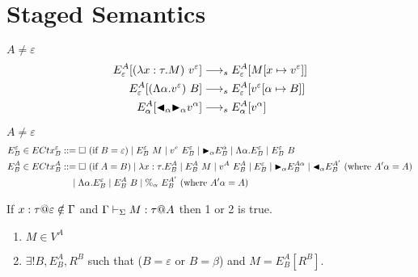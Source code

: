\section{ Staged Semantics }
	
	
$A \neq \varepsilon$\\
\begin{align*}
	E^A_\varepsilon [(\lambda x:\tau.M)\ v^\varepsilon] & \longrightarrow_s E^A_\varepsilon[M[x\mapsto v^\varepsilon]]      \\
	E^A_\varepsilon [(\Lambda\alpha.v^\varepsilon)\ B]  & \longrightarrow_s E^A_\varepsilon[v^\varepsilon[\alpha\mapsto B]] \\
	E^A_\alpha [{\mathop{\blacktriangleleft}}_\alpha {\mathop{\blacktriangleright}}_\alpha v^\alpha]        & \longrightarrow_s E^A_\alpha[v^\alpha]                            \\
\end{align*}
	
$A \neq \varepsilon$\\
\begin{align*}
	E^\varepsilon_B \in ECtx^\varepsilon_B & ::= \square\ (\text{if\ } B = \varepsilon) \mid E^\varepsilon_B\ M \mid v^e\ E^\varepsilon_B 
	\mid {\mathop{\blacktriangleright}}_\alpha E^\alpha_B \mid \Lambda\alpha.E^\varepsilon_B
	\mid E^\varepsilon_B\ B                                                                                                     \\
	E^A_B \in ECtx^A_B                     & ::= \square\ (\text{if } A = B) \mid \lambda x:\tau.E^A_B \mid E^A_B\ M \mid v^A\ E^A_B      
	\mid E^\varepsilon_B \mid {\mathop{\blacktriangleright}}_\alpha E^{A\alpha}_B
	\mid {\mathop{\blacktriangleleft}}_\alpha E^{A'}_B \ (\text{where } A'\alpha = A)                                                                              \\
	                                       & \quad \mid \Lambda\alpha.E^\varepsilon_B                                                     
	\mid E^A_B\ B \mid \%_\alpha\ E^{A'}_B \ (\text{where } A'\alpha = A)                                                       \\
\end{align*}
	
\begin{lemma}
	If $x:\tau@\varepsilon \notin \G$ and $\Gamma \vdash_\Sigma M : \tau @ A$ then 1 or 2 is true.
	\begin{enumerate}
		\item $ M \in V^A$
		\item $\exists ! B, E^A_B, R^B$ such that ($B = \varepsilon$ or $B = \beta$) and $M = E^A_B[R^B]$.
	\end{enumerate}
\end{lemma}
	
